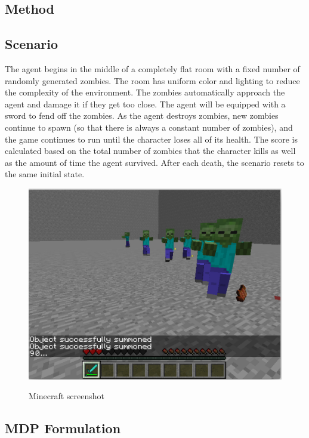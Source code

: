 \documentclass{article}
\begin{document}
\begin{multicols}{2}
\section{Method}


\subsection{Scenario}

The agent begins in the middle of a completely flat room with a fixed number of randomly generated zombies. The room has uniform color and lighting to reduce the complexity of the environment. The zombies automatically approach the agent and damage it if they get too close. The agent will be equipped with a sword to fend off the zombies. As the agent destroys zombies, new zombies continue to spawn (so that there is always a constant number of zombies), and the game continues to run until the character loses all of its health. The score is calculated based on the total number of zombies that the character kills as well as the amount of time the agent survived. After each death, the scenario resets to the same initial state.

\begin{figure}[H]
\caption{Minecraft screenshot}
\centering
\includegraphics[scale=0.3]{./hiro_screenshot.png}
\label{fig:screenShot}
\end{figure}

\subsection{MDP Formulation}


\end{multicols}
\end{document}
